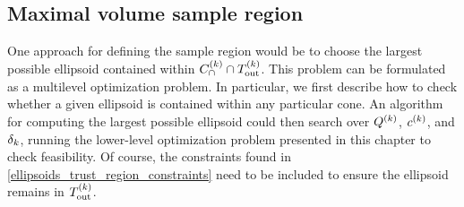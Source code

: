 %





%
%  
%


\subsection{Maximal volume sample region}
\label{ideal_ellipsoid_in_polyhedron}
\label{ellipsoid_in_cone}


One approach for defining the sample region would be to choose the largest possible ellipsoid contained within ${C^{(k)}_{\cap}} \cap {T_{\text{out}}^{(k)}}$.   
This problem can be formulated as a multilevel optimization problem.
In particular, we first describe how to check whether a given ellipsoid is contained within any particular cone.
An algorithm for computing the largest possible ellipsoid could then search over ${Q^{(k)}}$, $c^{(k)}$, and $\delta_k$, running the
lower-level optimization problem presented in this chapter to check feasibility.
Of course, the constraints found in \cref{ellipsoids_trust_region_constraints} need to be included to ensure the ellipsoid remains in ${T_{\text{out}}^{(k)}}$.



